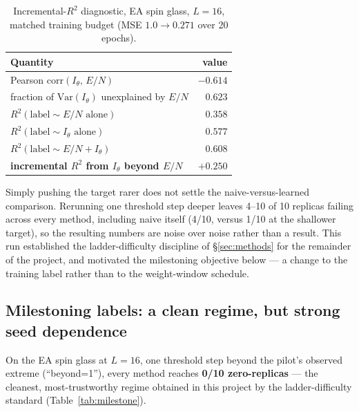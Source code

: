 \documentclass[a4paper,fleqn]{cas-sc}
\begin{document}
	\begin{table}[H]
		\centering\small
		\caption{Incremental-$R^2$ diagnostic, EA spin glass, $L=16$, matched training budget
			(MSE $1.0\to0.271$ over 20 epochs).}
		\label{tab:diagnostic}
		\begin{tabular}{lr}
			\toprule
			Quantity & value \\
			\midrule
			Pearson corr$(I_\theta,\,E/N)$ & $-0.614$ \\
			fraction of $\mathrm{Var}(I_\theta)$ unexplained by $E/N$ & $0.623$ \\
			$R^2(\text{label}\sim E/N\text{ alone})$ & $0.358$ \\
			$R^2(\text{label}\sim I_\theta\text{ alone})$ & $0.577$ \\
			$R^2(\text{label}\sim E/N+I_\theta)$ & $0.608$ \\
			\textbf{incremental $R^2$ from $I_\theta$ beyond $E/N$} & $\mathbf{+0.250}$ \\
			\bottomrule
		\end{tabular}
	\end{table}
	
	Simply pushing the target rarer does not settle the naive-versus-learned comparison.
	Rerunning one threshold step deeper leaves 4--10 of 10 replicas failing across every method,
	including naive itself (4/10, versus 1/10 at the shallower target), so the resulting numbers
	are noise over noise rather than a result. This run established the ladder-difficulty
	discipline of \S\ref{sec:methods} for the remainder of the project, and motivated the
	milestoning objective below --- a change to the training label rather than to the
	weight-window schedule.
	
	\subsection{Milestoning labels: a clean regime, but strong seed dependence}\label{sec:milestone}
	On the EA spin glass at $L=16$, one threshold step beyond the pilot's observed extreme
	(``beyond=1''), every method reaches \textbf{0/10 zero-replicas} --- the cleanest,
	most-trustworthy regime obtained in this project by the ladder-difficulty standard
	(Table~\ref{tab:milestone}).
	
\end{document}
